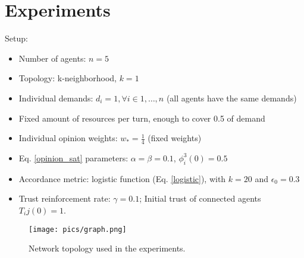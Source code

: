 \documentclass[conference,compsoc]{IEEEtran}
\begin{document}


\section{Experiments}

Setup:

\begin{itemize}
    \item Number of agents: $n = 5$
    \item Topology: k-neighborhood, $k=1$
    \item Individual demands: $d_i = 1, \forall i \in {1,\dots,n}$ (all agents have the same demands)
    \item Fixed amount of resources per turn, enough to cover 0.5 of demand
    \item Individual opinion weights: $w_{*} = \frac{1}{4}$ (fixed weights)
    \item Eq. \ref{opinion_sat} parameters: $\alpha = \beta = 0.1$, $\phi_{i}^{3}(0) = 0.5$
    \item Accordance metric: logistic function (Eq. \ref{logistic}), with $k=20$ and $\epsilon_0 = 0.3$
    \item Trust reinforcement rate: $\gamma = 0.1$; Initial trust of connected agents $T_ij(0) = 1$.
\end{itemize}


\begin{figure}
\centering
\texttt{[image: pics/graph.png]}
\caption{Network topology used in the experiments.}
\label{fig1}
\end{figure}


\end{document}
